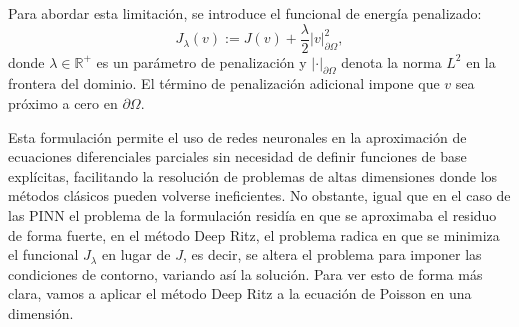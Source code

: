 \documentclass[a4paper,11pt,spanish, twoside, leqno]{tfg-uam}
\theoremstyle{definition}
\begin{document}
Para abordar esta limitación, se introduce el funcional de energía penalizado:
\begin{equation*}
J_{\lambda}(v) := J(v) + \frac{\lambda}{2} |v|^2_{\partial \Omega},
\end{equation*}
donde $ \lambda \in \mathbb{R}^+ $ es un parámetro de penalización y $ | \cdot |_{\partial \Omega} $ denota la norma $ L^2 $ en la frontera del dominio. El término de penalización adicional impone que $ v $ sea próximo a cero en $ \partial \Omega $.

Esta formulación permite el uso de redes neuronales en la aproximación de ecuaciones diferenciales parciales sin necesidad de definir funciones de base explícitas, facilitando la resolución de problemas de altas dimensiones donde los métodos clásicos pueden volverse ineficientes. No obstante, igual que en el caso de las PINN el problema de la formulación residía en que se aproximaba el residuo de forma fuerte, en el método Deep Ritz, el problema radica en que se minimiza el funcional $ J_{\lambda} $ en lugar de $ J $, es decir, se altera el problema para imponer las condiciones de contorno, variando así la solución. Para ver esto de forma más clara, vamos a aplicar el método Deep Ritz a la ecuación de Poisson en una dimensión.
\end{document}
